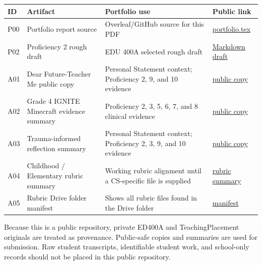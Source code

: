 \documentclass[12pt]{article}
\begin{document}
\begin{longtable}{p{}p{}p{}p{}}
\textbf{ID} & \textbf{Artifact} & \textbf{Portfolio use} & \textbf{Public link}\\ \hline
P00 & Portfolio report source & Overleaf/GitHub source for this PDF & \href{https://github.com/pzg8794/ED400-Comprehensive_Teaching_Portfolio/blob/main/reports/portfolio.tex}{portfolio.tex}\\
P02 & Proficiency 2 rough draft & EDU 400A selected rough draft & \href{https://github.com/pzg8794/ED400-Comprehensive_Teaching_Portfolio/blob/main/drafts/proficiency-02-learner-diversity-equity.md}{Markdown draft}\\
A01 & Dear Future-Teacher Me public copy & Personal Statement context; Proficiency 2, 9, and 10 evidence & \href{https://github.com/pzg8794/ED400-Comprehensive_Teaching_Portfolio/blob/main/artifacts/public-copies/dear-future-teacher-me.md}{public copy}\\
A02 & Grade 4 IGNITE Minecraft evidence summary & Proficiency 2, 3, 5, 6, 7, and 8 clinical evidence & \href{https://github.com/pzg8794/ED400-Comprehensive_Teaching_Portfolio/blob/main/artifacts/public-copies/minecraft-grade4-ignite-evidence-summary.md}{public copy}\\
A03 & Trauma-informed reflection summary & Personal Statement context; Proficiency 2, 3, 9, and 10 evidence & \href{https://github.com/pzg8794/ED400-Comprehensive_Teaching_Portfolio/blob/main/artifacts/public-copies/trauma-informed-reflection-summary.md}{public copy}\\
A04 & Childhood / Elementary rubric summary & Working rubric alignment until a CS-specific file is supplied & \href{https://github.com/pzg8794/ED400-Comprehensive_Teaching_Portfolio/blob/main/rubrics/childhood-education-rubric-summary.md}{rubric summary}\\
A05 & Rubric Drive folder manifest & Shows all rubric files found in the Drive folder & \href{https://github.com/pzg8794/ED400-Comprehensive_Teaching_Portfolio/blob/main/rubrics/drive-folder-manifest.md}{manifest}\\
\end{longtable}

Because this is a public repository, private ED400A and TeachingPlacement originals are treated as provenance. Public-safe copies and summaries are used for submission. Raw student transcripts, identifiable student work, and school-only records should not be placed in this public repository.
\end{document}
